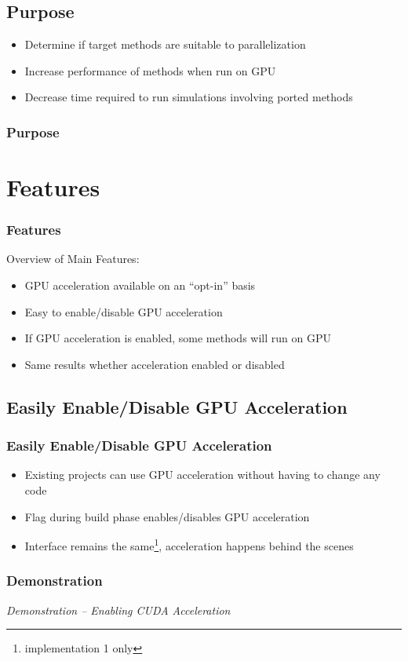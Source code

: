 \documentclass{beamer}
\begin{document}
\subsection{Purpose}
\begin{frame}
\begin{itemize}
\item Determine if target methods are suitable to parallelization 
\item Increase performance of methods when run on GPU
\item Decrease time required to run simulations involving ported methods
\end{itemize}
\frametitle{Purpose}
\end{frame}

\section{Features}
\begin{frame}
\frametitle{Features}
Overview of Main Features:
\begin{itemize}
\item GPU acceleration available on an ``opt-in'' basis
\item Easy to enable/disable GPU acceleration
\item If GPU acceleration is enabled, some methods will run on GPU
\item Same results whether acceleration enabled or disabled
\end{itemize}
\end{frame}

\subsection{Easily Enable/Disable GPU Acceleration}
\begin{frame}
\frametitle{Easily Enable/Disable GPU Acceleration}
\begin{itemize}
\item Existing projects can use GPU acceleration without having to change any code 
\item Flag during build phase enables/disables GPU acceleration
\item Interface remains the same\footnote{implementation 1 only}, acceleration happens behind the scenes
\end{itemize}
\end{frame}

\begin{frame}
\frametitle{Demonstration}
\begin{center}
\emph{Demonstration -- Enabling CUDA Acceleration}
\end{center}
\end{frame}
\end{document}
